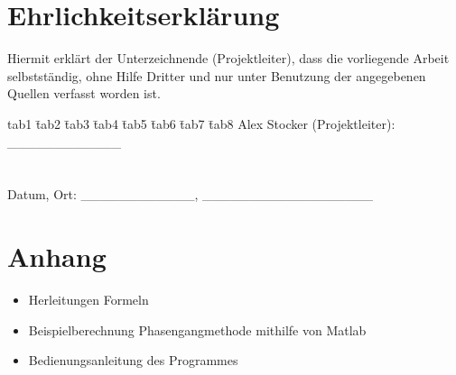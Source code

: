 \documentclass{fhnwreport}
\begin{document}


\section{Ehrlichkeitserklärung}
Hiermit erklärt der Unterzeichnende (Projektleiter), dass die vorliegende Arbeit selbstständig, ohne Hilfe Dritter und nur unter Benutzung der angegebenen Quellen verfasst worden ist.\newline
\\

\begin{tabbing}
tab1 \= tab2 \= tab3 \= tab4 \= tab5 \=tab6 \= tab7 \= tab8 \kill
Alex Stocker (Projektleiter): \>\>\>\>\>\>\_\_\_\_\_\_\_\_\_\_\_\_\\
\\
\\
Datum, Ort: \>\>\>\>\>\>\_\_\_\_\_\_\_\_\_\_\_\_, \_\_\_\_\_\_\_\_\_\_\_\_\_\_\_\_\_\_\\
\end{tabbing}



\newpage



\newpage
\section{Anhang}
\begin{itemize}
\item Herleitungen Formeln
\item Beispielberechnung Phasengangmethode mithilfe von Matlab
\item Bedienungsanleitung des Programmes
\end{itemize}



\end{document}
